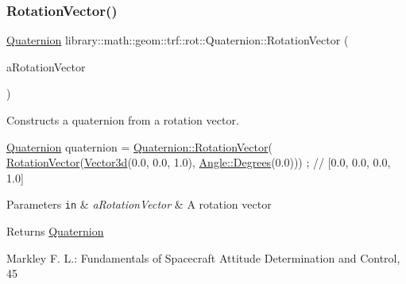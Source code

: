 \subsubsection{\texorpdfstring{Rotation\+Vector()}{RotationVector()}}
{\footnotesize\ttfamily \hyperlink{classlibrary_1_1math_1_1geom_1_1trf_1_1rot_1_1_quaternion}{Quaternion} library\+::math\+::geom\+::trf\+::rot\+::\+Quaternion\+::\+Rotation\+Vector (\begin{DoxyParamCaption}\item[{const \hyperlink{classlibrary_1_1math_1_1geom_1_1trf_1_1rot_1_1_rotation_vector}{rot\+::\+Rotation\+Vector} \&}]{a\+Rotation\+Vector }\end{DoxyParamCaption})\hspace{0.3cm}{\ttfamily [static]}}



Constructs a quaternion from a rotation vector. 


\begin{DoxyCode}
\hyperlink{classlibrary_1_1math_1_1geom_1_1trf_1_1rot_1_1_quaternion_aa7f459a08f5af38b9f7676a6bf36a21c}{Quaternion} quaternion = \hyperlink{classlibrary_1_1math_1_1geom_1_1trf_1_1rot_1_1_quaternion_ad2785ba5b5d632a1953dcd95124e0132}{Quaternion::RotationVector}(
      \hyperlink{classlibrary_1_1math_1_1geom_1_1trf_1_1rot_1_1_quaternion_ad2785ba5b5d632a1953dcd95124e0132}{RotationVector}(\hyperlink{namespacelibrary_1_1math_1_1obj_a977e84e9bf317a4e7dd9d6d671d6da2f}{Vector3d}(0.0, 0.0, 1.0), \hyperlink{classlibrary_1_1math_1_1geom_1_1_angle_a64aa53e8420aeb6f671d86c65c370bc8}{Angle::Degrees}(0.0))) ; \textcolor{comment}{//
       [0.0, 0.0, 0.0, 1.0]}
\end{DoxyCode}



\begin{DoxyParams}[1]{Parameters}
\mbox{\tt in}  & {\em a\+Rotation\+Vector} & A rotation vector \\
\hline
\end{DoxyParams}
\begin{DoxyReturn}{Returns}
\hyperlink{classlibrary_1_1math_1_1geom_1_1trf_1_1rot_1_1_quaternion}{Quaternion} 
\end{DoxyReturn}
Markley F. L.\+: Fundamentals of Spacecraft Attitude Determination and Control, 45 \mbox{\label{classlibrary_1_1math_1_1geom_1_1trf_1_1rot_1_1_quaternion_a7b5045b46500d4f20e98ff29a9ed4c88}} 
